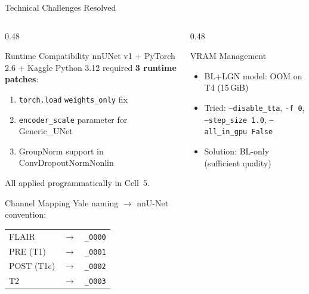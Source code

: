 \documentclass[aspectratio=169, dvipsnames]{beamer}
\begin{document}
\begin{frame}{Technical Challenges Resolved}
    \begin{columns}
        \begin{column}{0.48\textwidth}
            \begin{block}{ Runtime Compatibility}
                \small
                nnUNet v1 + PyTorch 2.6 + Kaggle Python 3.12 required \textbf{3 runtime patches}:
                \begin{enumerate}
                    \item \texttt{torch.load} \texttt{weights\_only} fix
                    \item \texttt{encoder\_scale} parameter for Generic\_UNet
                    \item GroupNorm support in ConvDropoutNormNonlin
                \end{enumerate}
                All applied programmatically in Cell~5.
            \end{block}

            \vspace{0.2em}

            \begin{block}{ Channel Mapping}
                \scriptsize
                Yale naming $\to$ nnU-Net convention:\\[0.2em]
                \begin{tabular}{lcl}
                    FLAIR & $\to$ & \texttt{\_0000} \\
                    PRE (T1) & $\to$ & \texttt{\_0001} \\
                    POST (T1c) & $\to$ & \texttt{\_0002} \\
                    T2 & $\to$ & \texttt{\_0003} \\
                \end{tabular}
            \end{block}
        \end{column}

        \begin{column}{0.48\textwidth}
            \begin{block}{ VRAM Management}
                \small
                \begin{itemize}
                    \item BL+LGN model: OOM on T4 (15\,GiB)
                    \item Tried: \texttt{--disable\_tta}, \texttt{-f 0}, \texttt{--step\_size 1.0}, \texttt{--all\_in\_gpu False}
                    \item Solution: BL-only (sufficient quality)
                \end{itemize}
            \end{block}


\end{column}
\end{columns}
\end{frame}
\end{document}
